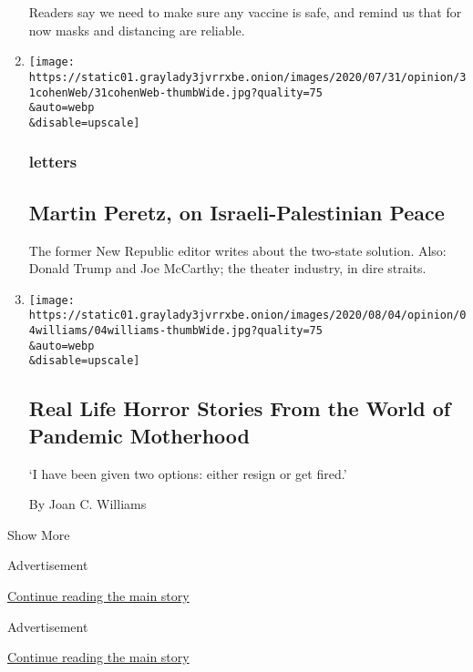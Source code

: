 \begin{enumerate}
  Readers say we need to make sure any vaccine is safe, and remind us
  that for now masks and distancing are reliable.
\item
  \href{/2020/08/06/opinion/letters/israel-palestinians.html}{}

  \texttt{[image: https://static01.graylady3jvrrxbe.onion/images/2020/07/31/opinion/31cohenWeb/31cohenWeb-thumbWide.jpg?quality=75\\\&auto=webp\\\&disable=upscale]}

  \hypertarget{letters-3}{%
  \subsubsection{letters}\label{letters-3}}

  \hypertarget{martin-peretz-on-israeli-palestinian-peace}{%
  \subsection{Martin Peretz, on Israeli-Palestinian
  Peace}\label{martin-peretz-on-israeli-palestinian-peace}}

  The former New Republic editor writes about the two-state solution.
  Also: Donald Trump and Joe McCarthy; the theater industry, in dire
  straits.
\item
  \href{/2020/08/06/opinion/mothers-discrimination-coronavirus.html}{}

  \texttt{[image: https://static01.graylady3jvrrxbe.onion/images/2020/08/04/opinion/04williams/04williams-thumbWide.jpg?quality=75\\\&auto=webp\\\&disable=upscale]}

  \hypertarget{real-life-horror-stories-from-the-world-of-pandemic-motherhood}{%
  \subsection{Real Life Horror Stories From the World of Pandemic
  Motherhood}\label{real-life-horror-stories-from-the-world-of-pandemic-motherhood}}

  `I have been given two options: either resign or get fired.'

  By Joan C. Williams
\end{enumerate}

Show More

Advertisement

\protect\hyperlink{after-mid2}{Continue reading the main story}

Advertisement

\protect\hyperlink{after-mktg}{Continue reading the main story}

